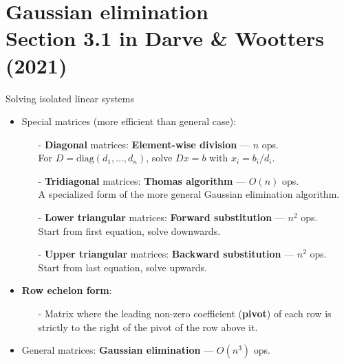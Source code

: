 \documentclass[t,usepdftitle=false]{beamer}
\begin{document}
\section{Gaussian elimination\\{\small Section 3.1 in Darve \& Wootters (2021)}}

\begin{frame}{Solving isolated linear systems}
\normalsize
\begin{itemize}
\item Special matrices (more efficient than general case):
\begin{itemize}\normalsize
\item[-] \textbf{Diagonal} matrices: \textbf{Element-wise division} --- $n$ ops.\\
For $D=\mathrm{diag}(d_1,\dots,d_n)$, solve $Dx=b$ with $x_i=b_i/d_i$.\vspace{.05cm}
\item[-] \textbf{Tridiagonal} matrices: \textbf{Thomas algorithm} --- $O(n)$ ops.\\
A specialized form of the more general Gaussian elimination algorithm.\vspace{.05cm}
\item[-] \textbf{Lower triangular} matrices: \textbf{Forward substitution} --- $n^2$ ops.\\
Start from first equation, solve downwards.\vspace{.05cm}
\item[-] \textbf{Upper triangular} matrices: \textbf{Backward substitution} --- $n^2$ ops.\\
Start from last equation, solve upwards.
\end{itemize}
\item \textbf{Row echelon form}: 
\begin{itemize}\normalsize
\item[-] Matrix where the leading non-zero coefficient (\textbf{pivot}) of each row is strictly to the right of the pivot of the row above it.
\vspace{.05cm}
\end{itemize}
\item General matrices: \textbf{Gaussian elimination} --- $O(n^3)$ ops.

\end{itemize}
\end{frame}
\end{document}

